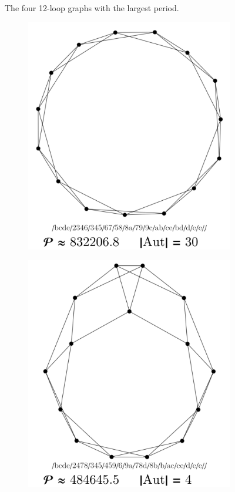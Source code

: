 \documentclass[12pt,a4paper]{article}
\renewcommand{\|}{\rule[-0.4ex]{0.2ex}{1.2em}}
\begin{document}
\begin{figure}[htb]
	\caption{The four 12-loop graphs with the largest period.}
	\label{largest_12}
\end{figure}



\begin{figure}[htb]
	\begin{subfigure}[b]{.24 \textwidth}
		\includegraphics[width=\linewidth]{largest_13_1}
		\subcaption{}
	\end{subfigure}
	\begin{subfigure}[b]{.24 \textwidth}
		\includegraphics[width=\linewidth]{largest_13_2}

\end{subfigure}
\end{figure}
\end{document}
